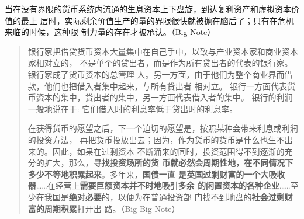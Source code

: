 当在没有界限的货币系统内流通的生息资本上下盘旋，到达复利资产和虚拟资本价值的最上
层时，实际剩余价值生产的量的界限很快就被抛在脑后了；只有在危机来临的时候，这种限
制力量的存在才被承认。（Big Note）

\begin{quotation}
  银行家把借贷货币资本大量集中在自己手中，以致与产业资本家和商业资本家相对立的，
  不是单个的贷出者，而是作为所有贷出者的代表的银行家。 银行家成了货币资本的总管理
  人。另一方面，由于他们为整个商业界而借款，他们也把借入者集中起来，与所有贷出者
  相对立。 银行一方面代表货币资本的集中，贷出者的集中，另一方面代表借入者的集中。
  银行的利润一般地说在于: 它们借入时的利息率低于贷出时的利息率。 

  在获得货币的愿望之后，下一个迫切的愿望是，按照某种会带来利息或利润的投资方法，
  再把货币投放出去；因为，作为货币的货币是什么也生不出来的。因此，如果在过剩资本
  不断涌来的同时，投资范围得不到逐渐的充分的扩大，那么，\textbf{寻找投资场所的货
    币就必然会周期性地，在不同情况下多少不等地积累起来}。多年来，\textbf{国债一直
    是英国过剩财富的一个大吸收器}……在经营上\textbf{需要巨额资本并不时地吸引多余
    的闲置资本的各种企业}……至少在我国是\textbf{绝对必要}的，以便为在普通投资部
  门找不到地盘的\textbf{社会过剩财富的周期积累}打开出
  路。（Big Big Note）


\end{quotation}



















